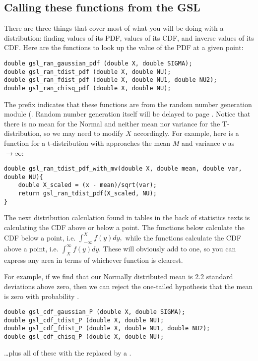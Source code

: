 \subsection{Calling these functions from the GSL}
There are three things that cover most of what you will be doing with a
distribution: finding values of its PDF, values of its CDF, and inverse
values of its CDF.
Here are the functions to look up the value of the PDF at a given point:
\begin{lstlisting}
double gsl_ran_gaussian_pdf (double X, double SIGMA);
double gsl_ran_tdist_pdf (double X, double NU);
double gsl_ran_fdist_pdf (double X, double NU1, double NU2);
double gsl_ran_chisq_pdf (double X, double NU);
\end{lstlisting}

The prefix  indicates that these functions are from the
random number generation module (. Random number generation itself will be delayed to page
\pageref{randomnumbers}. Notice that there is no mean for the Normal and neither mean nor variance
for the T-distribution, so we may need to modify $X$ accordingly. For
example, here is a function for a t-distribution with approaches the
mean $M$ and variance $v$ as $\to \infty$:
\begin{lstlisting}
double gsl_ran_tdist_pdf_with_mv(double X, double mean, double var, double NU){
    double X_scaled = (x - mean)/sqrt(var);
    return gsl_ran_tdist_pdf(X_scaled, NU);
}
\end{lstlisting}

The next distribution calculation found in tables in the back of
statistics texts is calculating the CDF above or below a point. 
The functions below calculate the CDF below a point, i.e.
$\int_{-\infty}^X f(y) dy,$
while the functions calculate the CDF above a point, i.e.
$\int^{\infty}_X f(y) dy.$
These will obviously add to one, so you can express any area in terms of whichever function is clearest.

For example, if we find that our Normally distributed mean is 2.2 standard
deviations above zero, then we can reject the one-tailed hypothesis that
the mean is zero with probability .

\begin{lstlisting}
double gsl_cdf_gaussian_P (double X, double SIGMA);
double gsl_cdf_tdist_P (double X, double NU);
double gsl_cdf_fdist_P (double X, double NU1, double NU2);
double gsl_cdf_chisq_P (double X, double NU);
\end{lstlisting}
\dots plus all of these with the  replaced by a .


